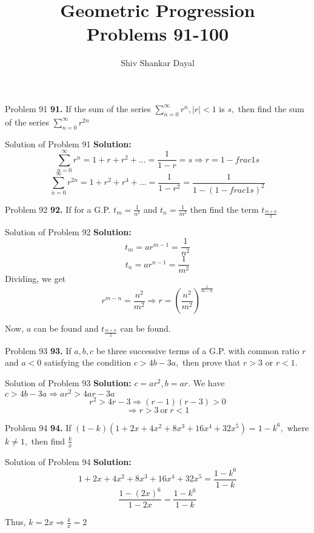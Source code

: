 \documentclass[aspectratio=1610,8pt]{beamer}
\title{Geometric Progression\\Problems 91-100}
\author[Shiv Shankar Dayal]{Shiv Shankar Dayal}
\begin{document}
\begin{frame}
  \titlepage
\end{frame}
\begin{frame}{Problem 91}
  \textbf{91.} If the sum of the series $\sum_{n = 0}^\infty r^n, |r| < 1$ is $s,$ then find the sum of the series $\sum_{n =
    0}^\infty r^{2n}$
\end{frame}
\begin{frame}{Solution of Problem 91}
  \textbf{Solution:} $$\sum_{n = 0}^\infty r^n = 1 + r + r^2 + \ldots = \frac{1}{1 - r} = s \Rightarrow r = 1 - frac{1}{s}$$
  $$\sum_{n = 0}^\infty r^{2n} = 1 + r^2 + r^4 + \ldots = \frac{1}{1 - r^2} = \frac{1}{1 - \left(1 - frac{1}{s}\right)^2}$$
\end{frame}
\begin{frame}{Problem 92}
  \textbf{92.} If for a G.P. $t_m = \frac{1}{n^2}$ and $t_n = \frac{1}{m^2}$ then find the term $t_{\frac{m + n}{2}}$
\end{frame}
\begin{frame}{Solution of Problem 92}
  \textbf{Solution:} $$t_m = ar^{m - 1} = \frac{1}{n^2}$$
  $$t_n = ar^{n - 1} = \frac{1}{m^2}$$
  Dividing, we get
  $$r^{m - n} = \frac{n^2}{m^2}\Rightarrow r = \left(\frac{n^2}{m^2}\right)^{\frac{1}{m - n}}$$

  Now, $a$ can be found and $t_{\frac{m + n}{2}}$ can be found.
\end{frame}
\begin{frame}{Problem 93}
  \textbf{93.} If $a, b, c$ be three successive terms of a G.P. with common ratio $r$ and $a < 0$ satisfying the condition $c > 4b
  - 3a,$ then prove that $r > 3$ or $r < 1.$
\end{frame}
\begin{frame}{Solution of Problem 93}
  \textbf{Solution:} $c = ar^2, b = ar.$ We have $c > 4b - 3a \Rightarrow ar^2 > 4ar - 3a$
  $$r^2 > 4r - 3 \Rightarrow (r - 1)(r - 3)> 0$$
  $$\Rightarrow r > 3~\text{or}~r < 1$$
\end{frame}
\begin{frame}{Problem 94}
  \textbf{94.} If $(1 - k)(1 + 2x + 4x^2 + 8x^3 + 16x^4 + 32x^5) = 1 - k^6,$ where $k \neq 1,$ then find $\frac{k}{x}$
\end{frame}
\begin{frame}{Solution of Problem 94}
  \textbf{Solution:} $$1 + 2x + 4x^2 + 8x^3 + 16x^4 + 32x^5 = \frac{1 - k^6}{1 - k}$$
  $$\frac{1 - (2x)^6}{1 - 2x} = \frac{1 - k^6}{1 - k}$$

  Thus, $k = 2x \Rightarrow \frac{k}{x} = 2$
\end{frame}
\end{document}
